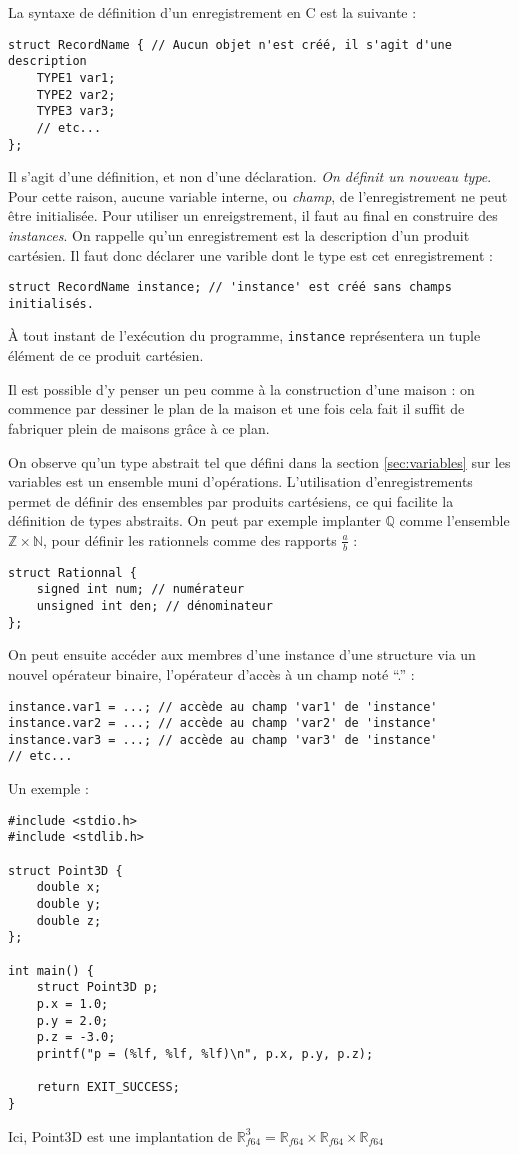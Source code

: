 \documentclass[../../../main.tex]{subfiles}
\begin{document}
La syntaxe de définition d'un enregistrement en C est la suivante :
\begin{verbatim}
struct RecordName { // Aucun objet n'est créé, il s'agit d'une description
	TYPE1 var1;
	TYPE2 var2;
	TYPE3 var3;
	// etc...
};
\end{verbatim}
Il s'agit d'une définition, et non d'une déclaration. \textit{On définit un nouveau type}. Pour cette raison, aucune variable interne, ou \textit{champ}, de l'enregistrement ne peut être initialisée. Pour utiliser un enreigstrement, il faut au final en construire des \textit{instances}. On rappelle qu'un enregistrement est la description d'un produit cartésien. Il faut donc déclarer une varible dont le type est cet enregistrement :
\begin{verbatim}
struct RecordName instance; // 'instance' est créé sans champs initialisés.
\end{verbatim}
À tout instant de l'exécution du programme, \texttt{instance} représentera un tuple élément de ce produit cartésien.

Il est possible d'y penser un peu comme à la construction d'une maison : on commence par dessiner le plan de la maison et une fois cela fait il suffit de fabriquer plein de maisons grâce à ce plan.

On observe qu'un type abstrait tel que défini dans la section \ref{sec:variables} sur les variables est un ensemble muni d'opérations. L'utilisation d'enregistrements permet de définir des ensembles par produits cartésiens, ce qui facilite la définition de types abstraits. On peut par exemple implanter $\mathbb{Q}$ comme l'ensemble $\mathbb{Z}\times{\mathbb{N}}$, pour définir les rationnels comme des rapports $\frac{a}{b}$ :
\begin{verbatim}
struct Rationnal {
	signed int num; // numérateur
	unsigned int den; // dénominateur
};
\end{verbatim}
On peut ensuite accéder aux membres d'une instance d'une structure via un nouvel opérateur binaire, l'opérateur d'accès à un champ noté ``.'' :
\begin{verbatim}
instance.var1 = ...; // accède au champ 'var1' de 'instance'
instance.var2 = ...; // accède au champ 'var2' de 'instance'
instance.var3 = ...; // accède au champ 'var3' de 'instance'
// etc...
\end{verbatim}
Un exemple :
\begin{verbatim}
#include <stdio.h>
#include <stdlib.h>

struct Point3D {
	double x;
	double y;
	double z;
};

int main() {
	struct Point3D p;
	p.x = 1.0;
	p.y = 2.0;
	p.z = -3.0;
	printf("p = (%lf, %lf, %lf)\n", p.x, p.y, p.z);

	return EXIT_SUCCESS;
}
\end{verbatim}
Ici, \textsf{Point3D} est une implantation de $\mathbb{R}_{f64}^{3} = \mathbb{R}_{f64}\times \mathbb{R}_{f64}\times \mathbb{R}_{f64}$
\end{document}
